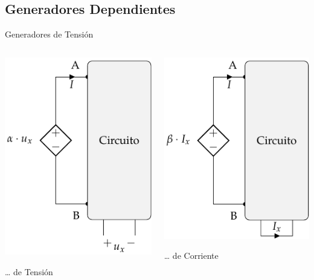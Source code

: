 \documentclass[aspectratio=169, usenames,svgnames,dvipsnames]{beamer}
\begin{document}
\subsection{Generadores Dependientes}
\label{sec:orga248a7e}

\begin{frame}[label={sec:org65b12c7}]{Generadores de Tensión}
\begin{columns}
\begin{column}{0.5\columnwidth}
  \begin{center}
\includegraphics[height=0.7\textheight]{../figs/FuenteTensionDependienteTension.pdf}
\end{center}
\ldots{} de Tensión
\end{column}
\begin{column}{0.5\columnwidth}
  \begin{center}
\includegraphics[height=0.7\textheight]{../figs/FuenteTensionDependienteCorriente.pdf}
\end{center}
\ldots{} de Corriente
\end{column}
\end{columns}
\end{frame}
\end{document}

